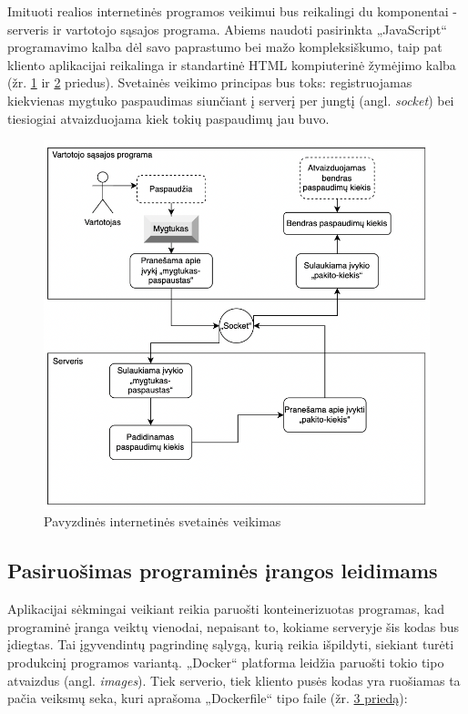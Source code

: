\documentclass{VUMIFPSkursinis}
\begin{document}
Imituoti realios internetinės programos veikimui bus reikalingi du komponentai - serveris ir vartotojo sąsajos programa. Abiems naudoti pasirinkta „JavaScript“ programavimo kalba dėl savo paprastumo bei mažo kompleksiškumo, taip pat kliento aplikacijai reikalinga ir standartinė HTML  kompiuterinė žymėjimo kalba (žr. \hyperref[priedas1]{1} ir \hyperref[priedas2]{2} priedus). Svetainės veikimo principas bus toks: registruojamas kiekvienas mygtuko paspaudimas siunčiant į serverį per jungtį (angl. \textit{socket}) bei tiesiogiai atvaizduojama kiek tokių paspaudimų jau buvo.

\begin{figure}[H]
    \centering
    \includegraphics[scale=0.8]{img/Aplikacija.png}
    \caption{Pavyzdinės internetinės svetainės veikimas}
    \label{img:mlp}
\end{figure}

\subsection{Pasiruošimas programinės įrangos leidimams}

Aplikacijai sėkmingai veikiant reikia paruošti konteinerizuotas programas, kad programinė įranga veiktų vienodai, nepaisant to, kokiame serveryje šis kodas bus įdiegtas. Tai įgyvendintų pagrindinę sąlygą, kurią reikia išpildyti, siekiant turėti produkcinį programos variantą. „Docker“ platforma leidžia paruošti tokio tipo atvaizdus (angl. \textit{images}). Tiek serverio, tiek kliento pusės kodas yra ruošiamas ta pačia veiksmų seka, kuri aprašoma „Dockerfile“ tipo faile (žr. \hyperref[priedas3]{3 priedą}):
\end{document}
